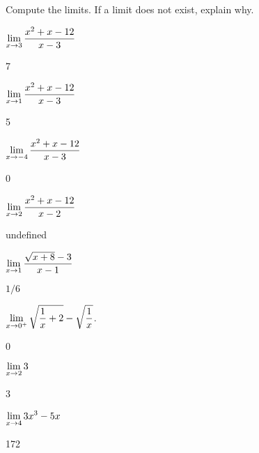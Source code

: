 \begin{exercises}

Compute the limits. If a limit does not exist, explain why.

\twocol

\begin{exercise} $\displaystyle \lim_{x\to 3}{x^2+x-12\over x-3}$
\begin{answer} 7
\end{answer}\end{exercise}

\begin{exercise} $\displaystyle \lim_{x\to 1}{x^2+x-12\over x-3}$
\begin{answer} 5
\end{answer}\end{exercise}

\begin{exercise} $\displaystyle \lim_{x\to -4}{x^2+x-12\over x-3}$
\begin{answer} 0
\end{answer}\end{exercise}

\begin{exercise} $\displaystyle \lim_{x\to 2} {x^2+x-12\over x-2}$
\begin{answer} undefined
\end{answer}\end{exercise}

\begin{exercise} $\displaystyle \lim_{x\to 1} {\sqrt{x+8}-3\over x-1}$
\begin{answer} $1/6$
\end{answer}\end{exercise}

\begin{exercise} $\displaystyle \lim_{x\to 0^+} \sqrt{{1\over x}+2} - \sqrt{1\over x}$.
\begin{answer} 0
\end{answer}\end{exercise}

\begin{exercise} $\displaystyle\lim _{x\to 2} 3$
\begin{answer} 3
\end{answer}\end{exercise}

\begin{exercise} $\displaystyle\lim _{x\to 4 } 3x^3 - 5x $
\begin{answer} 172
\end{answer}\end{exercise}


\end{exercises}
